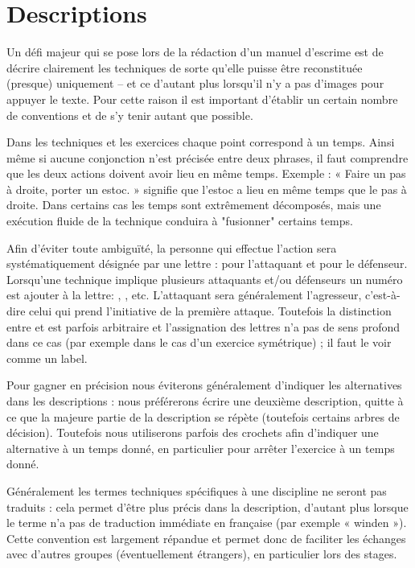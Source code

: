 \section{Descriptions}


Un défi majeur qui se pose lors de la rédaction d'un manuel d'escrime est de décrire clairement les techniques de sorte qu'elle puisse être reconstituée (presque) uniquement – et ce d'autant plus lorsqu'il n'y a pas d'images pour appuyer le texte.
Pour cette raison il est important d'établir un certain nombre de conventions et de s'y tenir autant que possible.

Dans les techniques et les exercices chaque point correspond à un temps.
Ainsi même si aucune conjonction n'est précisée entre deux phrases, il faut comprendre que les deux actions doivent avoir lieu en même temps.
Exemple : « Faire un pas à droite, porter un estoc. » signifie que l'estoc a lieu en même temps que le pas à droite.
Dans certains cas les temps sont extrêmement décomposés, mais une exécution fluide de la technique conduira à "fusionner" certains temps.

Afin d'éviter toute ambiguïté, la personne qui effectue l'action sera systématiquement désignée par une lettre : \A pour l'attaquant et \D pour le défenseur.
Lorsqu'une technique implique plusieurs attaquants et/ou défenseurs un numéro est ajouter à la lettre: , , etc.
L'attaquant sera généralement l'agresseur, c'est-à-dire celui qui prend l'initiative de la première attaque.
Toutefois la distinction entre \A et \D est parfois arbitraire et l'assignation des lettres n'a pas de sens profond dans ce cas (par exemple dans le cas d'un exercice symétrique) ; il faut le voir comme un label.

Pour gagner en précision nous éviterons généralement d'indiquer les alternatives dans les descriptions : nous préférerons écrire une deuxième description, quitte à ce que la majeure partie de la description se répète (toutefois certains arbres de décision).
Toutefois nous utiliserons parfois des crochets afin d'indiquer une alternative à un temps donné, en particulier pour arrêter l'exercice à un temps donné.

Généralement les termes techniques spécifiques à une discipline ne seront pas traduits : cela permet d'être plus précis dans la description, d'autant plus lorsque le terme n'a pas de traduction immédiate en française (par exemple « winden »).
Cette convention est largement répandue et permet donc de faciliter les échanges avec d'autres groupes (éventuellement étrangers), en particulier lors des stages.

